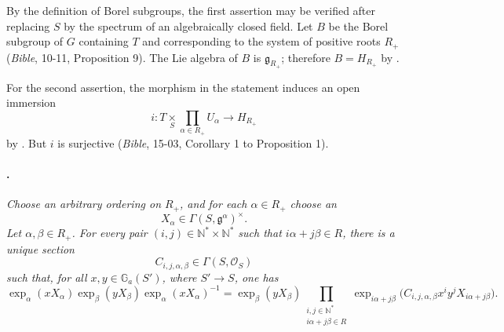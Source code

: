 By the definition of Borel subgroups, the first assertion may be
verified after replacing \(S\) by the spectrum of an algebraically
closed field. Let \(B\) be the Borel subgroup of \(G\) containing
\(T\) and corresponding to the system of positive roots \(R_+\)
\textup{(\emph{Bible}, 10-11, Proposition 9)}. The Lie algebra of
\(B\) is \(\mathfrak g_{R_+}\); therefore \(B=H_{R_+}\) by .

For the second assertion, the morphism in the statement induces an
open immersion
\[
  i:
  T\mathop{\times}\limits_S
  \prod_{\alpha\in R_+}U_\alpha
  \longrightarrow H_{R_+}
\]
by . But \(i\) is surjective
\textup{(\emph{Bible}, 15-03, Corollary 1 to Proposition 1)}.

\paragraph{.}
\textit{Choose an arbitrary ordering on \(R_+\), and for each
\(\alpha\in R_+\) choose an}
\[
  X_\alpha\in\Gamma(S,\mathfrak g^\alpha)^\times.
\]
\textit{Let \(\alpha,\beta\in R_+\). For every pair
\((i,j)\in\mathbb N^*\times\mathbb N^*\) such that
\(i\alpha+j\beta\in R\), there is a unique section}
\[
  C_{i,j,\alpha,\beta}\in\Gamma(S,\mathcal O_S)
\]
\textit{such that, for all \(x,y\in\mathbb G_a(S')\), where
\(S'\to S\), one has}
\[
  \exp_\alpha(xX_\alpha)
  \exp_\beta(yX_\beta)
  \exp_\alpha(xX_\alpha)^{-1}
  =
  \exp_\beta(yX_\beta)
  \prod_{\substack{i,j\in\mathbb N^*\\ i\alpha+j\beta\in R}}
    \exp_{i\alpha+j\beta}
      \bigl(C_{i,j,\alpha,\beta}x^iy^jX_{i\alpha+j\beta}\bigr).
\]

